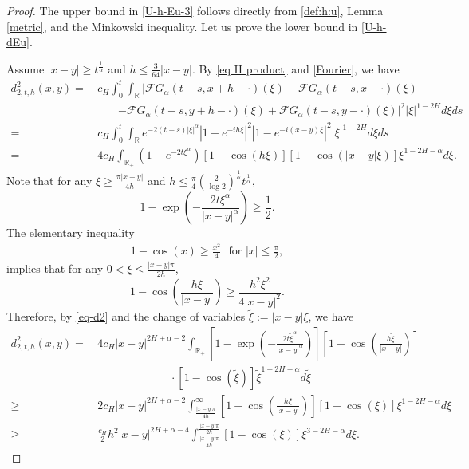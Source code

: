 \documentclass[11pt,reqno]{amsart}
\numberwithin{equation}{section}
\def\RR{\mathbb{R}}
\newcommand{\1}{{\bf 1}}
\newcommand{\2}{{\bf 2}}
\newcommand{\lc}{\left(}
\newcommand{\rc}{\right)}
\newcommand{\lt}{\left }
\newcommand{\rt}{\right}
\begin{document}
\begin{proof} The upper bound in \eqref{U-h-Eu-3} follows directly from \eqref{def:h:u}, Lemma \ref{metric}, and the Minkowski inequality. Let us prove the lower bound in \eqref{U-h-dEu}.

 Assume    $|x-y|\geq t^{\frac1{\alpha}}$ and $h\le \frac{3}{64}|x-y|$.    By \eqref{eq H product} and \eqref{Fourier}, we have
\begin{equation}
\begin{split}
d_{2,t,h}^2(x,y)
=&\, c_{H}\int_0^t\int_{\mathbb{R}} \left|
\mathcal{F} G_{\alpha}(t-s, x+h-\cdot)(\xi)-\mathcal{F} G_{\alpha}(t-s, x-\cdot)(\xi) \right. \\
& \quad\quad  \left. -\mathcal{F} G_{\alpha}(t-s, y+h-\cdot)(\xi) +\mathcal{F} G_{\alpha}(t-s, y-\cdot)(\xi) \right|^2  |\xi|^{1-2H}d\xi ds\\
=&\, c_{H}\int_0^t  \int_{\mathbb{R}} e^{-2(t-s)|\xi|^{\alpha}}  \left| 1 - e^{-ih\xi} \right|^2
   \left| 1 - e^{-i(x - y)\xi} \right|^2 |\xi|^{1-2H}d\xi  ds\\
=&\, 4c_{H}\int_{\mathbb{R}_+}\left( 1 - e^{-2t\xi^{\alpha}}\right)
   \left[ 1 - \cos(h\xi)\right]   \left[ 1 - \cos(|x - y|\xi)\right]  \xi^{1-2H - \alpha}d\xi.\label{eq-d2}
\end{split}
\end{equation}
Note that
for any $\xi\ge\frac{\pi|x-y|}{4h}$ and $h\leq\frac{\pi}{4}\lc\frac{2}{\log 2}\rc^{\frac{1}{\alpha}}t^{\frac{1}{\alpha}}$,
 \[
 1-\exp\lc-\frac{2t\xi^{\alpha}}{|x-y|^{\alpha}} \rc\geq \frac 12.
 \]
The elementary inequality
\begin{align}\label{eq elem}
1-\cos(x)\ge \frac{x^2}{4} \ \ \ \text{for } |x|\le \frac{\pi}{2},
\end{align}
implies that  for any $0<\xi\le \frac{|x-y|\pi}{2h}$,
\[
 1-\cos \left(\frac{h\xi}{|x-y|}\right)\ge
  \frac{h^2\xi^2}{4|x-y|^2}.
 \]
Therefore, by \eqref{eq-d2} and the change of variables $\tilde{\xi}:=|x-y|\xi$, we have
  \begin{equation}\label{d2:h}
    \begin{split}
       d_{2, t,h}^2(x,y)
        =&\, 4c_{H} |x-y|^{2H+\alpha-2} \int_{\RR_+}\lt[1-\exp\lc-\frac{2t\tilde{\xi}^{\alpha}}{|x-y|^{\alpha}}\rc\rt]\lt[1-\cos\lc \frac{h\tilde{\xi}}{|x-y|}\rc\rt] \\
        &\ \ \ \ \ \ \ \ \ \ \ \ \ \ \ \ \ \ \  \ \ \ \ \ \ \ \ \ \ \ \cdot\left[1-\cos\left(\tilde{\xi}\right)\right] \tilde{\xi}^{1-2H-\alpha}d\tilde{\xi} \\
        \geq&\,  2c_{H} |x-y|^{2H+\alpha-2}\int_{\frac{|x-y|\pi}{4h}}^{\infty} \lt[1-\cos\lc \frac{h\xi}{|x-y|}\rc\rt][1-\cos(\xi)] \xi^{1-2H-\alpha}d\xi \\
        \geq&\, \frac{c_{H}}{2} h^2|x-y|^{2H+\alpha-4}
        \int_{\frac{|x-y|\pi}{4h}}^{\frac{|x-y|\pi}{2h}} [1-\cos(\xi)] \xi^{3-2H-\alpha}d\xi.
    \end{split}
  \end{equation}


\end{proof}
\end{document}
